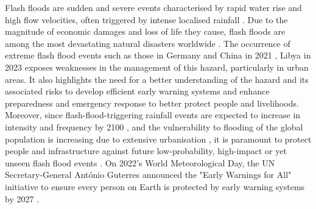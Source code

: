 \documentclass[nhess, manuscript]{copernicus}
\begin{document}
\introduction  

Flash floods are sudden and severe events characterised by rapid water rise and high flow velocities, often triggered by intense localised rainfall \citep{Wang_2023}. Due to the magnitude of economic damages and loss of life they cause, flash floods are among the most devastating natural disasters worldwide \citep{Rentschler_2022}. The occurrence of extreme flash flood events such as those in Germany \citep{Fekete_2021, Thieken_2023} and China in 2021 \citep{Manandhar_2023}, Libya in 2023 \citep{Hewson_2024b} exposes weaknesses in the management of this hazard, particularly in urban areas. It also highlights the need for a better understanding of the hazard and its associated risks to develop efficient early warning systems and enhance preparedness and emergency response to better protect people and livelihoods. Moreover, since flash-flood-triggering rainfall events are expected to increase in intensity and frequency by 2100 \citep{Kotz_2023, Thackeray_2022}, and the vulnerability to flooding of the global population is increasing due to extensive urbanisation \citep{Mazzoleni_2022}, it is paramount to protect people and infrastructure against future low-probability, high-impact or yet unseen flash flood events \citep{Hewson_2024a, Montanari_2024, Zhou_2022}. On 2022’s World Meteorological Day, the UN Secretary-General António Guterres announced the "Early Warnings for All" initiative to ensure every person on Earth is protected by early warning systems by 2027 \citep{WMO_2022}.
\end{document}
